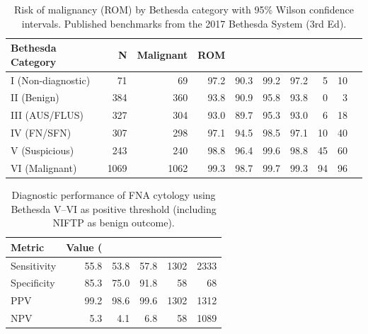 
\begin{table}[htbp]
\centering
\small
\caption{Risk of malignancy (ROM) by Bethesda category with 95\% Wilson confidence intervals. Published benchmarks from the 2017 Bethesda System (3rd Ed).}
\label{tab:m029_rom_bethesda}
\begin{tabular}{lrrrrrrrrr}
\toprule
Bethesda Category & N & Malignant & ROM \\%
\midrule
I (Non-diagnostic) & 71 & 69 & 97.2 & 90.3 & 99.2 & 97.2 & 5 & 10 \\
II (Benign) & 384 & 360 & 93.8 & 90.9 & 95.8 & 93.8 & 0 & 3 \\
III (AUS/FLUS) & 327 & 304 & 93.0 & 89.7 & 95.3 & 93.0 & 6 & 18 \\
IV (FN/SFN) & 307 & 298 & 97.1 & 94.5 & 98.5 & 97.1 & 10 & 40 \\
V (Suspicious) & 243 & 240 & 98.8 & 96.4 & 99.6 & 98.8 & 45 & 60 \\
VI (Malignant) & 1069 & 1062 & 99.3 & 98.7 & 99.7 & 99.3 & 94 & 96 \\
\bottomrule
\end{tabular}
\end{table}

\begin{table}[htbp]
\centering
\small
\caption{Diagnostic performance of FNA cytology using Bethesda V--VI as positive threshold (including NIFTP as benign outcome).}
\label{tab:m029_diag_perf_v56}
\begin{tabular}{lrrrrr}
\toprule
Metric & Value (\\%
\midrule
Sensitivity & 55.8 & 53.8 & 57.8 & 1302 & 2333 \\
Specificity & 85.3 & 75.0 & 91.8 & 58 & 68 \\
PPV & 99.2 & 98.6 & 99.6 & 1302 & 1312 \\
NPV & 5.3 & 4.1 & 6.8 & 58 & 1089 \\
\bottomrule
\end{tabular}
\end{table}

